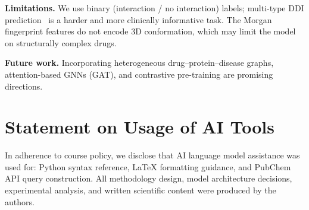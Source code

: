\documentclass[10pt,twocolumn]{article}
\begin{document}
\noindent\textbf{Limitations.}
We use binary (interaction / no interaction) labels; multi-type DDI
prediction~\cite{zitnik2018} is a harder and more clinically informative task.
The Morgan fingerprint features do not encode 3D conformation, which may
limit the model on structurally complex drugs.

\noindent\textbf{Future work.}
Incorporating heterogeneous drug–protein–disease graphs,
attention-based GNNs (GAT), and contrastive pre-training are promising
directions.

\section*{Statement on Usage of AI Tools}
In adherence to course policy, we disclose that AI language model assistance
was used for: Python syntax reference, LaTeX formatting guidance, and
PubChem API query construction.
All methodology design, model architecture decisions, experimental analysis,
and written scientific content were produced by the authors.



\end{document}
